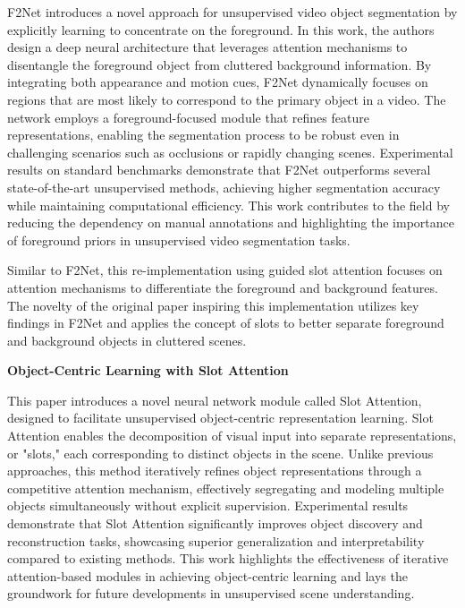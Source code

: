 \documentclass{article}
\theoremstyle{plain}
\theoremstyle{definition}
\theoremstyle{remark}
\begin{document}
\hspace{20pt} F2Net introduces a novel approach for unsupervised video object segmentation by explicitly learning to concentrate on the foreground. In this work, the authors design a deep neural architecture that leverages attention mechanisms to disentangle the foreground object from cluttered background information. By integrating both appearance and motion cues, F2Net dynamically focuses on regions that are most likely to correspond to the primary object in a video. The network employs a foreground-focused module that refines feature representations, enabling the segmentation process to be robust even in challenging scenarios such as occlusions or rapidly changing scenes. Experimental results on standard benchmarks demonstrate that F2Net outperforms several state-of-the-art unsupervised methods, achieving higher segmentation accuracy while maintaining computational efficiency. This work contributes to the field by reducing the dependency on manual annotations and highlighting the importance of foreground priors in unsupervised video segmentation tasks.

\hspace{20pt} Similar to F2Net, this re-implementation using guided slot attention focuses on attention mechanisms to differentiate the foreground and background features. The novelty of the original paper inspiring this implementation utilizes key findings in F2Net and applies the concept of slots to better separate foreground and background objects in cluttered scenes.

\textbf{Object-Centric Learning with Slot Attention}

\hspace{20pt} This paper introduces a novel neural network module called Slot Attention, designed to facilitate unsupervised object-centric representation learning. Slot Attention enables the decomposition of visual input into separate representations, or "slots," each corresponding to distinct objects in the scene. Unlike previous approaches, this method iteratively refines object representations through a competitive attention mechanism, effectively segregating and modeling multiple objects simultaneously without explicit supervision. Experimental results demonstrate that Slot Attention significantly improves object discovery and reconstruction tasks, showcasing superior generalization and interpretability compared to existing methods. This work highlights the effectiveness of iterative attention-based modules in achieving object-centric learning and lays the groundwork for future developments in unsupervised scene understanding.
\end{document}
